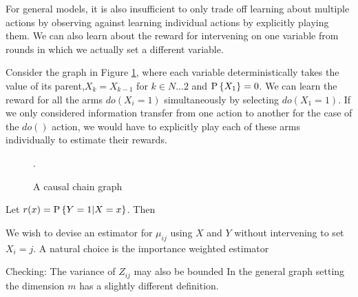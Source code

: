 For general models, it is also insufficient to only trade off learning about multiple actions by observing against learning individual actions by explicitly playing them. We can also learn about the reward for intervening on one variable from rounds in which we actually set a different variable.


Consider the graph in Figure \ref{fig:causalchain}, where each variable deterministically takes the value of its parent,$X_k = X_{k-1}$ for $k\in {N...2}$ and $\P{X_1} = 0$. We can learn the reward for all the arms $do(X_i = 1)$ simultaneously by selecting $do(X_1 = 1)$. If we only considered information transfer from one action to another for the case of the $do()$ action, we would have to explicitly play each of these arms individually to estimate their rewards. 

\begin{figure}[h]
\centering
\caption{A causal chain graph}.
\label{fig:causalchain}
\end{figure} 


Let $r(x) = \P{Y = 1|X = x}$. Then



We wish to devise an estimator for $\mu_{ij}$ using $X$ and $Y$ without
intervening to set $X_i = j$. A natural choice is the importance weighted estimator


Checking:
The variance of $Z_{ij}$ may also be bounded
In the general graph setting the dimension $m$ has a slightly different definition.

